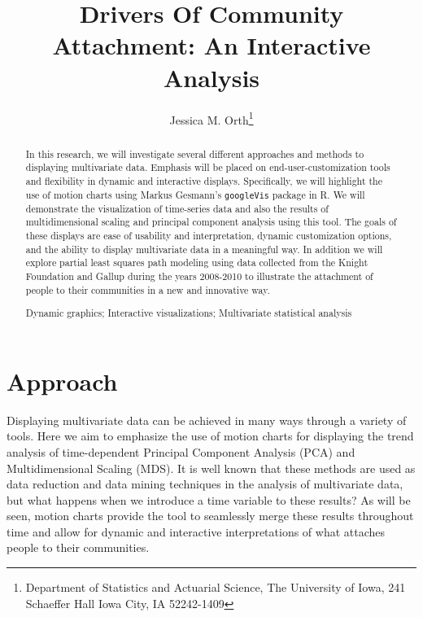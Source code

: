 \documentclass[11pt]{asaproc}
\title{Drivers Of Community Attachment: An Interactive Analysis}
\author{Jessica M. Orth\thanks{Department of Statistics and Actuarial Science, The University of Iowa, 241 Schaeffer Hall Iowa City, IA 52242-1409
}}
\begin{document}


\maketitle

\begin{abstract}
In this research, we will investigate several different approaches and
methods to displaying multivariate data. Emphasis will be placed on
end-user-customization tools and flexibility in dynamic and
interactive displays. Specifically, we will highlight the use of
motion charts using Markus Gesmann's \texttt{googleVis} package in R. We will
demonstrate the visualization of time-series data and also the results
of multidimensional scaling and principal component analysis using
this tool. The goals of these displays are ease of usability and
interpretation, dynamic customization options, and the ability to
display multivariate data in a meaningful way. In addition we will
explore partial least squares path modeling using data collected from
the Knight Foundation and Gallup during the years 2008-2010 to
illustrate the attachment of people to their communities in a new and
innovative way.  
\begin{keywords}
Dynamic graphics; Interactive visualizations; Multivariate
statistical analysis 
\end{keywords}
\end{abstract}



\section{Approach}
Displaying multivariate data can be achieved in many ways through a
variety of tools. Here we aim to emphasize the use of motion charts
for displaying the trend analysis of time-dependent Principal
Component Analysis (PCA) and Multidimensional Scaling (MDS). It is well known that
these methods are used as data reduction and data mining techniques in the
analysis of multivariate data, but what happens when we introduce a
time variable to these results? As will be seen, motion charts provide
the tool to seamlessly merge these results throughout time and allow
for dynamic and interactive interpretations of what attaches people to
their communities. 
\end{document}
